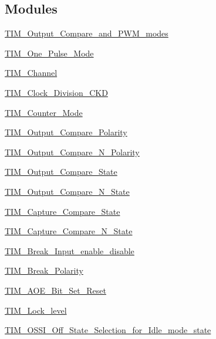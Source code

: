 \subsection*{Modules}
\begin{DoxyCompactItemize}
\item 
\hyperlink{group___t_i_m___output___compare__and___p_w_m__modes}{T\+I\+M\+\_\+\+Output\+\_\+\+Compare\+\_\+and\+\_\+\+P\+W\+M\+\_\+modes}
\item 
\hyperlink{group___t_i_m___one___pulse___mode}{T\+I\+M\+\_\+\+One\+\_\+\+Pulse\+\_\+\+Mode}
\item 
\hyperlink{group___t_i_m___channel}{T\+I\+M\+\_\+\+Channel}
\item 
\hyperlink{group___t_i_m___clock___division___c_k_d}{T\+I\+M\+\_\+\+Clock\+\_\+\+Division\+\_\+\+C\+KD}
\item 
\hyperlink{group___t_i_m___counter___mode}{T\+I\+M\+\_\+\+Counter\+\_\+\+Mode}
\item 
\hyperlink{group___t_i_m___output___compare___polarity}{T\+I\+M\+\_\+\+Output\+\_\+\+Compare\+\_\+\+Polarity}
\item 
\hyperlink{group___t_i_m___output___compare___n___polarity}{T\+I\+M\+\_\+\+Output\+\_\+\+Compare\+\_\+\+N\+\_\+\+Polarity}
\item 
\hyperlink{group___t_i_m___output___compare___state}{T\+I\+M\+\_\+\+Output\+\_\+\+Compare\+\_\+\+State}
\item 
\hyperlink{group___t_i_m___output___compare___n___state}{T\+I\+M\+\_\+\+Output\+\_\+\+Compare\+\_\+\+N\+\_\+\+State}
\item 
\hyperlink{group___t_i_m___capture___compare___state}{T\+I\+M\+\_\+\+Capture\+\_\+\+Compare\+\_\+\+State}
\item 
\hyperlink{group___t_i_m___capture___compare___n___state}{T\+I\+M\+\_\+\+Capture\+\_\+\+Compare\+\_\+\+N\+\_\+\+State}
\item 
\hyperlink{group___t_i_m___break___input__enable__disable}{T\+I\+M\+\_\+\+Break\+\_\+\+Input\+\_\+enable\+\_\+disable}
\item 
\hyperlink{group___t_i_m___break___polarity}{T\+I\+M\+\_\+\+Break\+\_\+\+Polarity}
\item 
\hyperlink{group___t_i_m___a_o_e___bit___set___reset}{T\+I\+M\+\_\+\+A\+O\+E\+\_\+\+Bit\+\_\+\+Set\+\_\+\+Reset}
\item 
\hyperlink{group___t_i_m___lock__level}{T\+I\+M\+\_\+\+Lock\+\_\+level}
\item 
\hyperlink{group___t_i_m___o_s_s_i___off___state___selection__for___idle__mode__state}{T\+I\+M\+\_\+\+O\+S\+S\+I\+\_\+\+Off\+\_\+\+State\+\_\+\+Selection\+\_\+for\+\_\+\+Idle\+\_\+mode\+\_\+state}

\end{DoxyCompactItemize}
